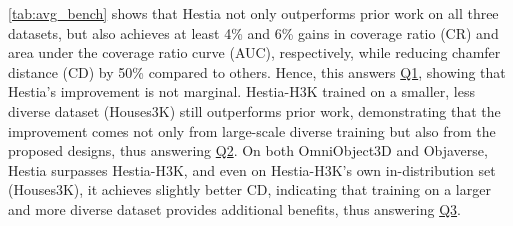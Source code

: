 \cref{tab:avg_bench} shows that Hestia not only outperforms prior work on all three datasets, but also achieves at least 4\% and 6\% gains in coverage ratio (CR) and area under the coverage ratio curve (AUC), respectively, while reducing chamfer distance (CD) by 50\% compared to others.
Hence, this answers \underline{Q1}, showing that Hestia’s improvement is not marginal.
Hestia-H3K trained on a smaller, less diverse dataset (Houses3K) still outperforms prior work, demonstrating that the improvement comes not only from large-scale diverse training but also from the proposed designs, thus answering \underline{Q2}.
On both OmniObject3D and Objaverse, Hestia surpasses Hestia-H3K, and even on Hestia-H3K’s own in-distribution set (Houses3K), it achieves slightly better CD, indicating that training on a larger and more diverse dataset provides additional benefits, thus answering \underline{Q3}.

